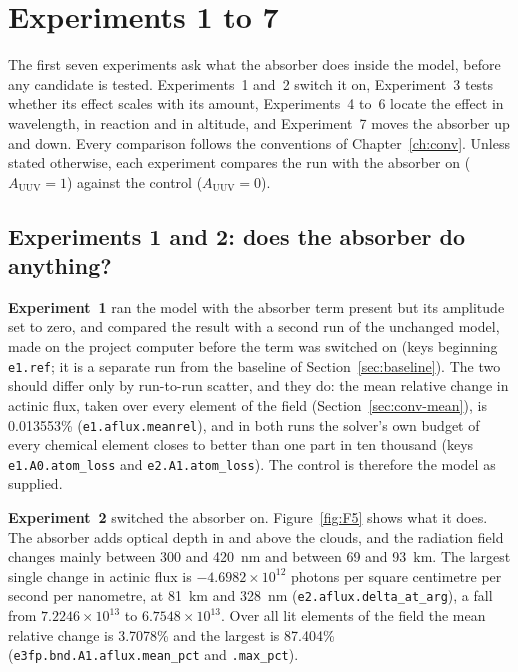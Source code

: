 
\chapter{Experiments 1 to 7}
\label{ch:exp17}

The first seven experiments ask what the absorber does inside the model, before any
candidate is tested. Experiments~1 and~2 switch it on, Experiment~3 tests whether its
effect scales with its amount, Experiments~4 to~6 locate the effect in wavelength, in
reaction and in altitude, and Experiment~7 moves the absorber up and down. Every
comparison follows the conventions of Chapter~\ref{ch:conv}. Unless stated otherwise,
each experiment compares the run with the absorber on ($A_{\mathrm{UUV}} = 1$) against
the control ($A_{\mathrm{UUV}} = 0$).

\section{Experiments 1 and 2: does the absorber do anything?}
\label{sec:e12}

\textbf{Experiment~1} ran the model with the absorber term present but its amplitude set
to zero, and compared the result with a second run of the unchanged model, made on the project
computer before the term was switched on (keys beginning \texttt{e1.ref}; it is a separate
run from the baseline of Section~\ref{sec:baseline}). The two should differ only by run-to-run scatter, and they do: the mean
relative change in actinic flux, taken over every element of the field
(Section~\ref{sec:conv-mean}), is 0.013553\% (\texttt{e1.aflux.meanrel}), and in both
runs the solver's own budget of every chemical element closes to better than one part in
ten thousand (keys \texttt{e1.A0.atom\_loss} and \texttt{e2.A1.atom\_loss}). The control
is therefore the model as supplied.

\textbf{Experiment~2} switched the absorber on. Figure~\ref{fig:F5} shows what it does.
The absorber adds optical depth in and above the clouds, and the radiation field changes
mainly between 300 and 420~nm and between 69 and 93~km. The largest single change in
actinic flux is $-4.6982\times10^{12}$ photons per square centimetre per second per
nanometre, at 81~km and 328~nm (\texttt{e2.aflux.delta\_at\_arg}), a fall from
$7.2246\times10^{13}$ to $6.7548\times10^{13}$. Over all lit elements of the field the
mean relative change is 3.7078\% and the largest is 87.404\%
(\texttt{e3fp.bnd.A1.aflux.mean\_pct} and \texttt{.max\_pct}).

